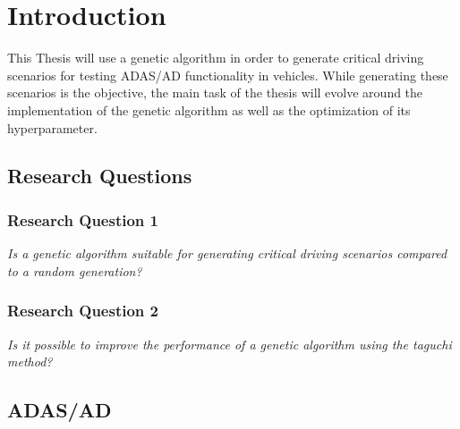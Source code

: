 \chapter{Introduction}
This Thesis will use a genetic algorithm in order to generate critical driving scenarios for testing ADAS/AD functionality in vehicles.
While generating these scenarios is the objective, the main task of the thesis will evolve around the implementation of the genetic algorithm as well as the optimization of its hyperparameter.

\section{Research Questions}
\subsection{Research Question 1}
\textit{Is a genetic algorithm suitable for generating critical driving scenarios compared to a random generation?}

\subsection{Research Question 2}
\textit{Is it possible to improve the performance of a genetic algorithm using the taguchi method?}


\section{ADAS/AD}
